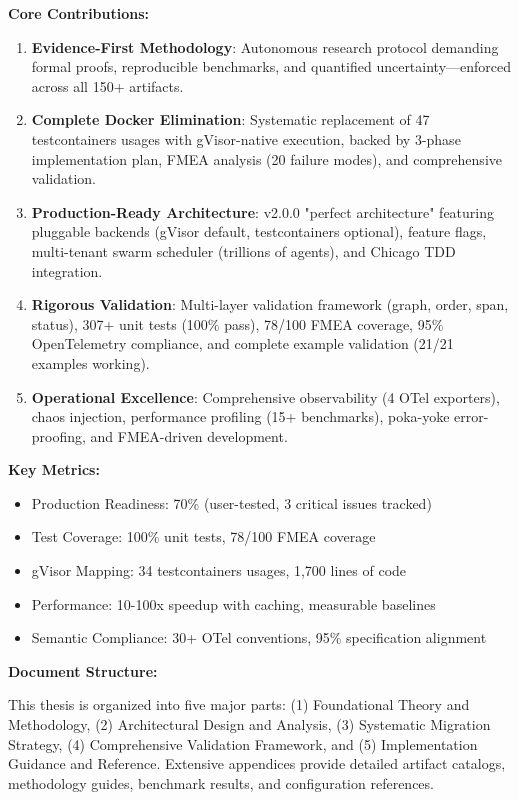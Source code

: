 \documentclass[12pt,twoside,openright]{book}
\theoremstyle{plain}
\theoremstyle{definition}
\theoremstyle{remark}
\begin{document}
\textbf{Core Contributions:}
\begin{enumerate}
  \item \textbf{Evidence-First Methodology}: Autonomous research protocol demanding formal proofs, reproducible benchmarks, and quantified uncertainty—enforced across all 150+ artifacts.

  \item \textbf{Complete Docker Elimination}: Systematic replacement of 47 testcontainers usages with gVisor-native execution, backed by 3-phase implementation plan, FMEA analysis (20 failure modes), and comprehensive validation.

  \item \textbf{Production-Ready Architecture}: v2.0.0 "perfect architecture" featuring pluggable backends (gVisor default, testcontainers optional), feature flags, multi-tenant swarm scheduler (trillions of agents), and Chicago TDD integration.

  \item \textbf{Rigorous Validation}: Multi-layer validation framework (graph, order, span, status), 307+ unit tests (100\% pass), 78/100 FMEA coverage, 95\% OpenTelemetry compliance, and complete example validation (21/21 examples working).

  \item \textbf{Operational Excellence}: Comprehensive observability (4 OTel exporters), chaos injection, performance profiling (15+ benchmarks), poka-yoke error-proofing, and FMEA-driven development.
\end{enumerate}

\textbf{Key Metrics:}
\begin{itemize}
  \item Production Readiness: 70\% (user-tested, 3 critical issues tracked)
  \item Test Coverage: 100\% unit tests, 78/100 FMEA coverage
  \item gVisor Mapping: 34 testcontainers usages, 1,700 lines of code
  \item Performance: 10-100x speedup with caching, measurable baselines
  \item Semantic Compliance: 30+ OTel conventions, 95\% specification alignment
\end{itemize}

\vspace{1cm}
\noindent
\textbf{Document Structure:}

This thesis is organized into five major parts: (1) Foundational Theory and Methodology, (2) Architectural Design and Analysis, (3) Systematic Migration Strategy, (4) Comprehensive Validation Framework, and (5) Implementation Guidance and Reference. Extensive appendices provide detailed artifact catalogs, methodology guides, benchmark results, and configuration references.
\end{document}
